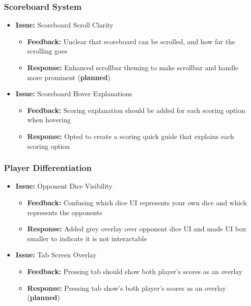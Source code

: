 \documentclass{article}
\begin{document}
\subsubsection{Scoreboard System}
\begin{itemize}
    \item \textbf{Issue:} Scoreboard Scroll Clarity
    \begin{itemize}
        \item \textbf{Feedback:} Unclear that scoreboard can be scrolled, and how far the scrolling goes
        \item \textbf{Response:} Enhanced scrollbar theming to make scrollbar and handle more prominent (\textbf{planned})
    \end{itemize}
    
    \item \textbf{Issue:} Scoreboard Hover Explanations
    \begin{itemize}
        \item \textbf{Feedback:} Scoring explanation should be added for each scoring option when hovering
        \item \textbf{Response:} Opted to create a scoring quick guide that explains each scoring option
    \end{itemize}
\end{itemize}

\subsubsection{Player Differentiation}
\begin{itemize}
    \item \textbf{Issue:} Opponent Dice Visibility
    \begin{itemize}
        \item \textbf{Feedback:} Confusing which dice UI represents your own dice and which represents the opponents
        \item \textbf{Response:} Added grey overlay over opponent dice UI and made UI box smaller to indicate it is not interactable
    \end{itemize}
    
    \item \textbf{Issue:} Tab Screen Overlay
    \begin{itemize}
        \item \textbf{Feedback:} Pressing tab should show both player's scores as an overlay
        \item \textbf{Response:} Pressing tab show's both player's scores as an overlay (\textbf{planned})
    \end{itemize}
\end{itemize}
\end{document}
